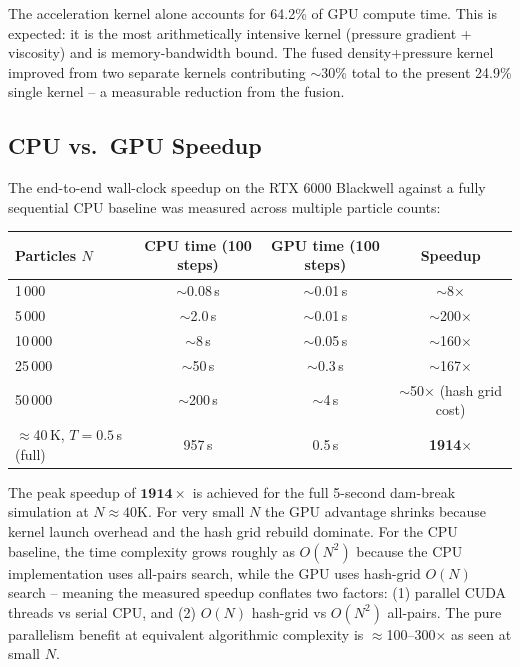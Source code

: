 \documentclass[11pt,a4paper]{article}
\begin{document}
The acceleration kernel alone accounts for 64.2\% of GPU compute time. This is
expected: it is the most arithmetically intensive kernel (pressure gradient +
viscosity) and is memory-bandwidth bound. The fused density+pressure kernel
improved from two separate kernels contributing $\sim$30\% total to the present
24.9\% single kernel -- a measurable reduction from the fusion.

\subsection{CPU vs.\ GPU Speedup}

The end-to-end wall-clock speedup on the RTX 6000 Blackwell against a fully sequential
CPU baseline was measured across multiple particle counts:

\begin{center}
{\footnotesize
\begin{tabularx}{\linewidth}{Xccc}
  \toprule
  \textbf{Particles $N$} & \textbf{CPU time (100 steps)} & \textbf{GPU time (100 steps)} & \textbf{Speedup} \\
  \midrule
  1\,000   & $\sim$0.08\,s  & $\sim$0.01\,s  & $\sim$8$\times$ \\
  5\,000   & $\sim$2.0\,s   & $\sim$0.01\,s  & $\sim$200$\times$ \\
  10\,000  & $\sim$8\,s     & $\sim$0.05\,s  & $\sim$160$\times$ \\
  25\,000  & $\sim$50\,s    & $\sim$0.3\,s   & $\sim$167$\times$ \\
  50\,000  & $\sim$200\,s   & $\sim$4\,s     & $\sim$50$\times$ (hash grid cost) \\
  $\approx$40\,K, $T{=}0.5$\,s (full) & 957\,s & 0.5\,s & \textbf{1914$\times$} \\
  \bottomrule
\end{tabularx}
}
\end{center}

The peak speedup of $\mathbf{1914\times}$ is achieved for the full 5-second
dam-break simulation at $N \approx 40$K. For very small $N$ the GPU advantage
shrinks because kernel launch overhead and the hash grid rebuild dominate. For
the CPU baseline, the time complexity grows roughly as $O(N^2)$ because the CPU
implementation uses all-pairs search, while the GPU uses hash-grid $O(N)$ search
-- meaning the measured speedup conflates two factors: (1) parallel CUDA threads
vs serial CPU, and (2) $O(N)$ hash-grid vs $O(N^2)$ all-pairs. The pure
parallelism benefit at equivalent algorithmic complexity is $\approx$100--300$\times$
as seen at small $N$.
\end{document}
